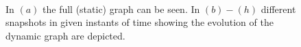 \begin{figure}[h!tb]
   \hfill
  \\
  \hfill
    \hfill
  \caption{In $(a)$ the full (static) graph can be seen. In $(b)-(h)$ different snapshots in given instants of time showing the evolution of the dynamic graph are depicted.}
  \label{fig:dynamic-graph-example}
\end{figure}

